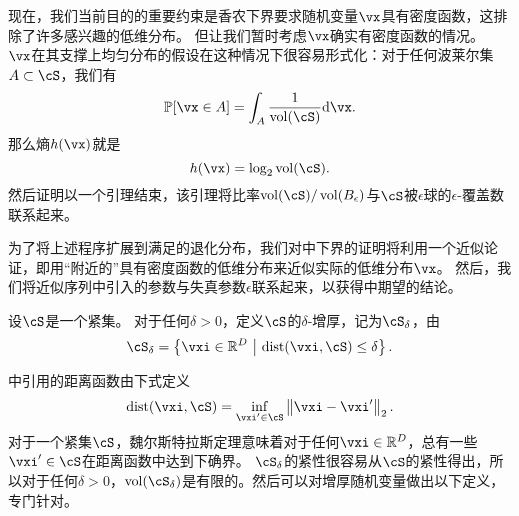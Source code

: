 \documentclass[../../book-main.tex]{subfiles}
\begin{document}
现在，我们当前目的的重要约束是香农下界要求随机变量$\vx$具有密度函数，这排除了许多感兴趣的低维分布。
但让我们暂时考虑$\vx$确实有密度函数的情况。
$\vx$在其支撑上均匀分布的假设在这种情况下很容易形式化：对于任何波莱尔集$A \subset \cS$，我们有
\begin{equation}
    \Pr[\vx \in A] = \int_{A} \frac{1}{\volume(\cS)} \odif \vx.
\end{equation}
那么熵$h(\vx)$就是
\begin{equation}
    h(\vx) = \log_2 \volume(\cS).
\end{equation}
然后证明以一个引理结束，该引理将比率$\volume(\cS) / \volume(B_{\epsilon})$与$\cS$被$\epsilon$球的$\epsilon$-覆盖数联系起来。


为了将上述程序扩展到满足的退化分布，我们对中下界的证明将利用一个近似论证，即用“附近的”具有密度函数的低维分布来近似实际的低维分布$\vx$。
然后，我们将近似序列中引入的参数与失真参数$\epsilon$联系起来，以获得中期望的结论。


\begin{definition}\label{def:thickening-set}
    设$\cS$是一个紧集。
    对于任何$\delta > 0$，定义$\cS$的$\delta$-增厚，记为$\cS_{\delta}$，由
    \begin{equation}
        \cS_{\delta} = \set*{\vxi \in \R^D \given \mathrm{dist}(\vxi, \cS) \leq
        \delta}.
    \end{equation}
\end{definition}
中引用的距离函数由下式定义
\begin{equation}\label{eq:dist-func}
    \dist(\vxi, \cS) = \inf_{\vxi' \in \cS} \norm*{\vxi - \vxi'}_2.
\end{equation}
对于一个紧集$\cS$，魏尔斯特拉斯定理意味着对于任何$\vxi \in \R^D$，总有一些$\vxi' \in \cS$在距离函数中达到下确界。
$\cS_{\delta}$的紧性很容易从$\cS$的紧性得出，所以对于任何$\delta > 0$，$\volume(\cS_{\delta})$是有限的。然后可以对增厚随机变量做出以下定义，专门针对。

\end{document}
